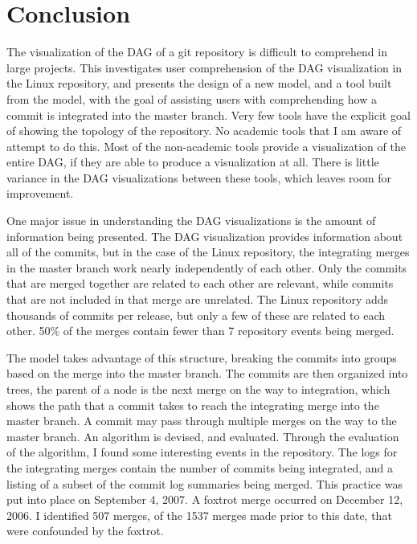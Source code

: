 \chapter{Conclusion}\label{chap:conclusion}

The visualization of the DAG of a git repository is difficult to
comprehend in large projects.
This \paper{} investigates user comprehension of the DAG
visualization in the Linux repository, and presents the design of a new
model, and a tool built from the model, with the goal of assisting users
with comprehending how a commit is integrated into the master branch.
Very few tools have the explicit goal of showing the topology of the
repository. No academic tools that I am aware of attempt to do this.
Most of the non-academic tools provide a visualization of the entire
DAG, if they are able to produce a visualization at all. There is little
variance in the DAG visualizations between these tools, which leaves
room for improvement.

One major issue in understanding the DAG visualizations is the amount of
information being presented. The DAG visualization provides information
about all of the commits, but in the case of the Linux repository, the
integrating merges in the master branch work nearly independently of
each other. Only the commits that are merged together are related to
each other are relevant, while commits that are not included in that
merge are unrelated. The Linux repository adds thousands of commits per
release, but only a few of these are related to each other. 50\% of the
merges contain fewer than 7 repository events being merged.

The \mt{} model takes advantage of this structure, breaking the commits
into groups based on the merge into the master branch. The commits are
then organized into trees, the parent of a node is the next merge on the
way to integration, which shows the path that a commit takes to reach
the integrating merge into the master branch.  A commit may pass through
multiple merges on the way to the master branch. An algorithm is
devised, and evaluated. Through the evaluation of the algorithm, I found
some interesting events in the repository. The logs for the integrating
merges contain the number of commits being integrated, and a listing of
a subset of the commit log summaries being merged. This practice was put
into place on September 4, 2007. A foxtrot merge occurred on December
12, 2006. I identified 507 merges, of the 1537 merges made prior to this
date, that were confounded by the foxtrot.


